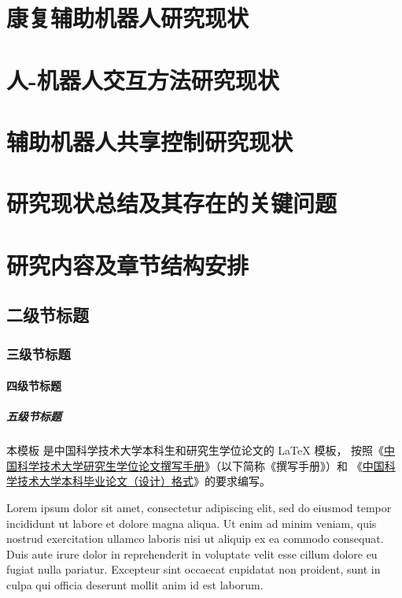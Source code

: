 \section{康复辅助机器人研究现状}

\section{人-机器人交互方法研究现状}

\section{辅助机器人共享控制研究现状}

\section{研究现状总结及其存在的关键问题}

\section{研究内容及章节结构安排}

\subsection{二级节标题}

\subsubsection{三级节标题}

\paragraph{四级节标题}

\subparagraph{五级节标题}

本模板  是中国科学技术大学本科生和研究生学位论文的 \LaTeX{}
模板， 按照《\href{https://gradschool.ustc.edu.cn/static/upload/article/picture/ce3b02e5f0274c90b9331ef50ae1ac26.pdf}
{中国科学技术大学研究生学位论文撰写手册}》（以下简称《撰写手册》）和
《\href{https://www.teach.ustc.edu.cn/?attachment_id=13867}
{中国科学技术大学本科毕业论文（设计）格式}》的要求编写。

Lorem ipsum dolor sit amet, consectetur adipiscing elit, sed do eiusmod tempor
incididunt ut labore et dolore magna aliqua.
Ut enim ad minim veniam, quis nostrud exercitation ullamco laboris nisi ut
aliquip ex ea commodo consequat.
Duis aute irure dolor in reprehenderit in voluptate velit esse cillum dolore eu
fugiat nulla pariatur.
Excepteur sint occaecat cupidatat non proident, sunt in culpa qui officia
deserunt mollit anim id est laborum.



